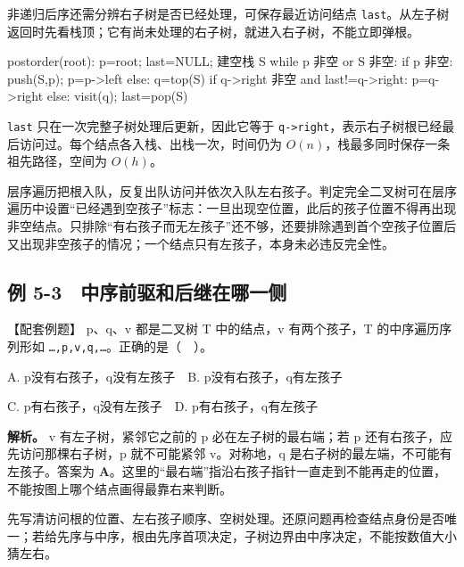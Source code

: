 非递归后序还需分辨右子树是否已经处理，可保存最近访问结点 \texttt{last}。从左子树返回时先看栈顶；它有尚未处理的右子树，就进入右子树，不能立即弹根。

\begin{codeblock}[language={}]
postorder(root):
    p=root; last=NULL; 建空栈 S
    while p 非空 or S 非空:
        if p 非空:
            push(S,p); p=p->left
        else:
            q=top(S)
            if q->right 非空 and last!=q->right:
                p=q->right
            else:
                visit(q); last=pop(S)
\end{codeblock}

\texttt{last} 只在一次完整子树处理后更新，因此它等于 \texttt{q->\allowbreak{}right}，表示右子树根已经最后访问过。每个结点各入栈、出栈一次，时间仍为 \(O(n)\)，栈最多同时保存一条祖先路径，空间为 \(O(h)\)。

层序遍历把根入队，反复出队访问并依次入队左右孩子。判定完全二叉树可在层序遍历中设置``已经遇到空孩子''标志：一旦出现空位置，此后的孩子位置不得再出现非空结点。只排除``有右孩子而无左孩子''还不够，还要排除遇到首个空孩子位置后又出现非空孩子的情况；一个结点只有左孩子，本身未必违反完全性。

\subsection{例 5-3　中序前驱和后继在哪一侧}\label{DS05-ex3}

\begin{example}[配套案例]

【配套例题】 p、q、v 都是二叉树 T 中的结点，v 有两个孩子，T 的中序遍历序列形如 \texttt{…,\allowbreak{}p,\allowbreak{}v,\allowbreak{}q,\allowbreak{}…}。正确的是（　）。

A. p没有右孩子，q没有左孩子　B. p没有右孩子，q有左孩子

C. p有右孩子，q没有左孩子　D. p有右孩子，q有左孩子

\end{example}

\textbf{解析。} v 有左子树，紧邻它之前的 p 必在左子树的最右端；若 p 还有右孩子，应先访问那棵右子树，p 就不可能紧邻 v。对称地，q 是右子树的最左端，不可能有左孩子。答案为 \textbf{A}。这里的``最右端''指沿右孩子指针一直走到不能再走的位置，不能按图上哪个结点画得最靠右来判断。

\begin{methodbox}[遍历问题先固定三个条件]

先写清访问根的位置、左右孩子顺序、空树处理。还原问题再检查结点身份是否唯一；若给先序与中序，根由先序首项决定，子树边界由中序决定，不能按数值大小猜左右。

\end{methodbox}

